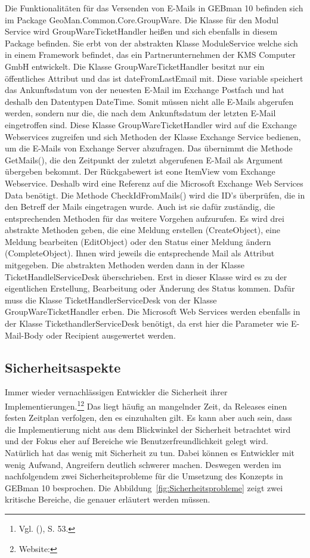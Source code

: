 \noindent
Die Funktionalitäten für das Versenden von E-Mails in GEBman 10 befinden sich im Package GeoMan.Common.Core.GroupWare. Die Klasse für den Modul Service wird GroupWareTicketHandler heißen und sich ebenfalls in diesem Package befinden. Sie erbt von der abstrakten Klasse ModuleService welche sich in einem Framework befindet, das ein Partnerunternehmen der KMS Computer GmbH entwickelt. Die Klasse GroupWareTicketHandler besitzt nur ein öffentliches Attribut und das ist dateFromLastEmail mit. Diese variable speichert das Ankunftsdatum von der neuesten E-Mail im Exchange Postfach und hat deshalb den Datentypen DateTime. Somit müssen nicht alle E-Mails abgerufen werden, sondern nur die, die nach dem Ankunftsdatum der letzten E-Mail eingetroffen sind.\newline
Diese Klasse GroupWareTicketHandler wird auf die Exchange Webservices zugreifen und sich Methoden der Klasse Exchange Service bedienen, um die E-Mails von Exchange Server abzufragen. Das übernimmt die Methode GetMails(), die den Zeitpunkt der zuletzt abgerufenen E-Mail als Argument übergeben bekommt. Der Rückgabewert ist eone ItemView vom Exchange Webservice. Deshalb wird eine Referenz auf die Microsoft Exchange Web Services Data benötigt.
\newline 
Die Methode CheckIdFromMails() wird die ID's überprüfen, die in den Betreff der Mails eingetragen wurde. Auch ist sie dafür zuständig, die entsprechenden Methoden für das weitere Vorgehen aufzurufen. Es wird drei abstrakte Methoden geben, die eine Meldung erstellen (CreateObject), eine Meldung bearbeiten (EditObject) oder den Status einer Meldung ändern (CompleteObject). Ihnen wird jeweils die entsprechende Mail als Attribut mitgegeben. Die abstrakten Methoden werden dann in der Klasse TicketHandlelServiceDesk überschrieben. Erst in dieser Klasse wird es zu der eigentlichen Erstellung, Bearbeitung oder Änderung des Status kommen. Dafür muss die Klasse TicketHandlerServiceDesk von der Klasse GroupWareTicketHandler erben. Die Microsoft Web Services werden ebenfalls in der Klasse TickethandlerServiceDesk benötigt, da erst hier die Parameter wie E-Mail-Body oder Recipient ausgewertet werden.


\subsection{Sicherheitsaspekte}
\noindent
Immer wieder vernachlässigen Entwickler die Sicherheit ihrer Implementierungen.\footnote{Vgl. \citeauthor{Ziegler} (\citeyear{Ziegler}), S. 53.}\footnote{Website:\cite{Sicherheit1}} Das liegt häufig an mangelnder Zeit, da Releases einen festen Zeitplan verfolgen, den es einzuhalten gilt. Es kann aber auch sein, dass die Implementierung nicht aus dem Blickwinkel der Sicherheit betrachtet wird und der Fokus eher auf Bereiche wie Benutzerfreundlichkeit gelegt wird. Natürlich hat das wenig mit Sicherheit zu tun. Dabei können es Entwickler mit wenig Aufwand, Angreifern deutlich schwerer machen. Deswegen werden im nachfolgendem zwei Sicherheitsprobleme für die Umsetzung des Konzepts in GEBman 10 besprochen. Die Abbildung~\ref{fig:Sicherheitsprobleme} zeigt zwei kritische Bereiche, die genauer erläutert werden müssen.

